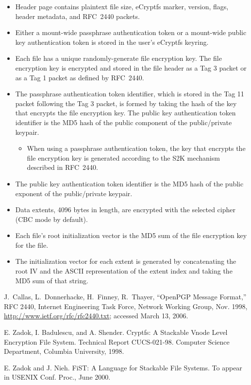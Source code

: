 \documentclass{article}
\begin{document}
\begin{itemize}
\item{Header page contains plaintext file size, eCryptfs marker,
  version, flags, header metadata, and RFC~2440 packets.}
\item{Either a mount-wide passphrase authentication token or a
  mount-wide public key authentication token is stored in the user's
  eCryptfs keyring.}
\item{Each file has a unique randomly-generate file encryption
  key. The file encryption key is encrypted and stored in the file
  header as a Tag 3 packet or as a Tag 1 packet as defined by
  RFC~2440.}
\item{The passphrase authentication token identifier, which is stored
  in the Tag 11 packet following the Tag 3 packet, is formed by taking
  the hash of the key that encrypts the file encryption key. The
  public key authentication token identifier is the MD5 hash of the
  public component of the public/private keypair.}
  \begin{itemize}
  \item{When using a passphrase authentication token, the key that
    encrypts the file encryption key is generated according to the S2K
    mechanism described in RFC~2440.}
  \end{itemize}
\item{The public key authentication token identifier is the MD5 hash
  of the public exponent of the public/private keypair.}
\item{Data extents, 4096 bytes in length, are encrypted with the
  selected cipher (CBC mode by default).}
\item{Each file's root initialization vector is the MD5 sum of the
  file encryption key for the file.}
\item{The initialization vector for each extent is generated by
  concatenating the root IV and the ASCII representation of the extent
  index and taking the MD5 sum of that string.}
\end{itemize}

\begin{thebibliography}{1}

 J.~Callas, L.~Donnerhacke, H.~Finney, R.~Thayer,
``OpenPGP Message Format,'' RFC 2440, Internet Engineering Task Force,
Network Working Group, Nov. 1998,
\url{http://www.ietf.org/rfc/rfc2440.txt}; accessed March 13, 2006.

 E. Zadok, I. Badulescu, and A. Shender. Cryptfs: A
Stackable Vnode Level Encryption File System. Technical Report
CUCS-021-98. Computer Science Department, Columbia University, 1998.

 E. Zadok and J. Nieh. FiST: A Language for Stackable
File Systems. To appear in USENIX Conf. Proc., June 2000.

\end{thebibliography}
\end{document}
